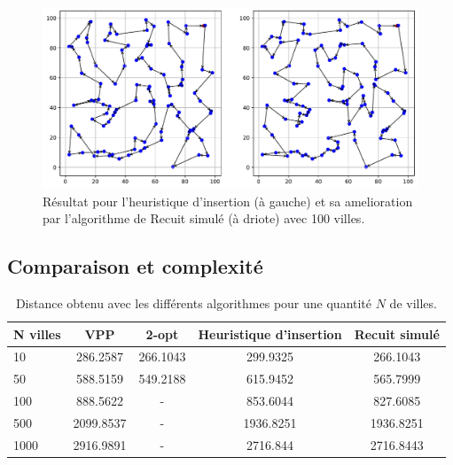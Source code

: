 \documentclass[a4paper,11pt,fleqn]{article}
\begin{document}
\begin{figure}[H]
    \centering
    \includegraphics[width=\textwidth]{images/recuit_simule.pdf}
    \caption{Résultat pour l'heuristique d'insertion (à gauche) et sa amelioration par l'algorithme de Recuit simulé (à driote) avec 100 villes.}
    \label{fig:recuit}
\end{figure}

\subsection*{Comparaison et complexité}

\begin{table}[H]
    \centering
    \caption{Distance obtenu avec les différents algorithmes pour une quantité $N$ de villes.}
    \label{tab:distances}
    \begin{tabular}{lcccc}
        \hline
        N villes & VPP & 2-opt & Heuristique d'insertion & Recuit simulé \\ \hline\hline
        10  & 286.2587  & 266.1043  & 299.9325 & 266.1043 \\
        50  & 588.5159  & 549.2188  & 615.9452 & 565.7999 \\
        100 & 888.5622 & - & 853.6044 & 827.6085 \\
        500 & 2099.8537 & - & 1936.8251 & 1936.8251 \\
        1000 & 2916.9891 & - & 2716.844 & 2716.8443  \\ \hline
    \end{tabular}
\end{table}
\end{document}
